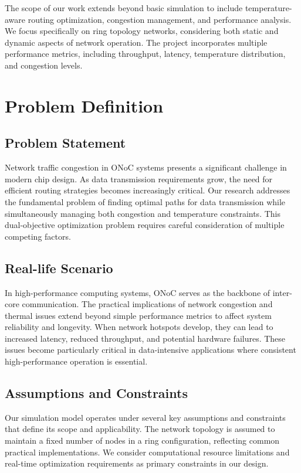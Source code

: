 \documentclass[12pt]{article}
\begin{document}
The scope of our work extends beyond basic simulation to include temperature-aware routing optimization, congestion management, and performance analysis. We focus specifically on ring topology networks, considering both static and dynamic aspects of network operation. The project incorporates multiple performance metrics, including throughput, latency, temperature distribution, and congestion levels.

\section{Problem Definition}
\subsection{Problem Statement}
Network traffic congestion in ONoC systems presents a significant challenge in modern chip design. As data transmission requirements grow, the need for efficient routing strategies becomes increasingly critical. Our research addresses the fundamental problem of finding optimal paths for data transmission while simultaneously managing both congestion and temperature constraints. This dual-objective optimization problem requires careful consideration of multiple competing factors.

\subsection{Real-life Scenario}
In high-performance computing systems, ONoC serves as the backbone of inter-core communication. The practical implications of network congestion and thermal issues extend beyond simple performance metrics to affect system reliability and longevity. When network hotspots develop, they can lead to increased latency, reduced throughput, and potential hardware failures. These issues become particularly critical in data-intensive applications where consistent high-performance operation is essential.

\subsection{Assumptions and Constraints}
Our simulation model operates under several key assumptions and constraints that define its scope and applicability. The network topology is assumed to maintain a fixed number of nodes in a ring configuration, reflecting common practical implementations. We consider computational resource limitations and real-time optimization requirements as primary constraints in our design.
\end{document}
